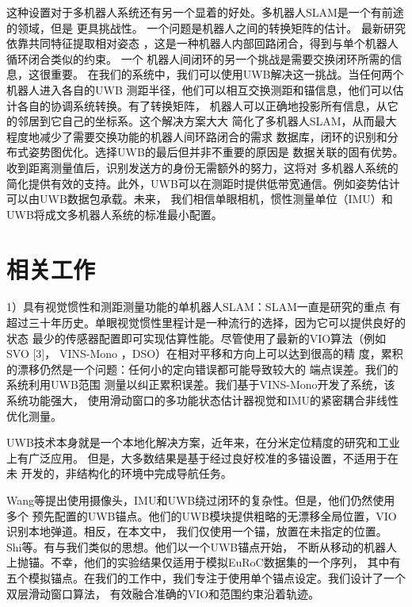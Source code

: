 \begin{translation}
这种设置对于多机器人系统还有另一个显着的好处。多机器人SLAM是一个有前途的领域，但是
更具挑战性。 一个问题是机器人之间的转换矩阵的估计\cite{saeedi2016multiple}。 最新研究依靠共同特征提取相对姿态
，这是一种机器人内部回路闭合，得到与单个机器人循环闭合类似的约束。 一个
机器人间闭环的另一个挑战是需要交换闭环所需的信息，这很重要。
在我们的系统中，我们可以使用UWB解决这一挑战。当任何两个机器人进入各自的UWB
测距半径，他们可以相互交换测距和锚信息，他们可以估计各自的协调系统转换。有了转换矩阵，
机器人可以正确地投影所有信息，从它的邻居到它自己的坐标系。这个解决方案大大
简化了多机器人SLAM，从而最大程度地减少了需要交换功能的机器人间环路闭合的需求
数据库，闭环的识别和分布式姿势图优化。选择UWB的最后但并非不重要的原因是
数据关联的固有优势。收到距离测量值后，识别发送方的身份无需额外的努力，这将对
多机器人系统的简化提供有效的支持。此外，UWB可以在测距时提供低带宽通信。例如姿势估计可以由UWB数据包承载。未来，
我们相信单眼相机，惯性测量单位（IMU）和UWB将成文多机器人系统的标准最小配置。


\section{相关工作}


1）具有视觉惯性和测距测量功能的单机器人SLAM：SLAM一直是研究的重点
有超过三十年\cite{cadena2016past}历史。单眼视觉惯性里程计是一种流行的选择，因为它可以提供良好的状态
最少的传感器配置即可实现估算性能。尽管使用了最新的VIO算法（例如SVO [3]，
VINS-Mono \cite{qin2018vins}，DSO\cite{engel2017direct}）在相对平移和方向上可以达到很高的精
度，累积的漂移仍然是一个问题：任何小的定向错误都可能导致较大的
端点误差。我们的系统利用UWB范围 测量以纠正累积误差。我们基于VINS-Mono开发了系统，该系统功能强大，
使用滑动窗口的多功能状态估计器视觉和IMU的紧密耦合非线性优化测量。

UWB技术本身就是一个本地化解决方案，近年来，在分米定位精度的研究和工业上有广泛应用。
但是，大多数结果是基于经过良好校准的多锚设置\cite{prorok2014accurate}，不适用于在未
开发的，非结构化的环境中完成导航任务。

Wang等\cite{wang2017ultra}提出使用摄像头，IMU和UWB绕过闭环的复杂性。但是，他们仍然使用多个
预先配置的UWB锚点。他们的UWB模块提供粗略的无漂移全局位置，VIO识别本地弹道。相反，在本文中，
我们仅使用一个锚，放置在未指定的位置。 Shi等。\cite{shi2019visual}有与我们类似的思想。他们以一个UWB锚点开始，
不断从移动的机器人上抛锚。不幸，他们的实验结果仅适用于模拟EuRoC数据集的一个序列\cite{burri2016euroc}，
其中有五个模拟锚点。在我们的工作中，我们专注于使用单个锚点设定。我们设计了一个双层滑动窗口算法，
有效融合准确的VIO和范围约束沿着轨迹。



\end{translation}
